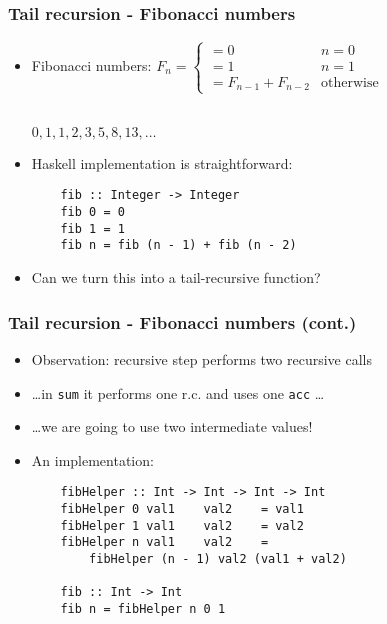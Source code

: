 \documentclass[final,handout]{beamer}
\begin{document}
\begin{frame}[fragile]
    \frametitle{Tail recursion - Fibonacci numbers}

    \begin{itemize}

        \item Fibonacci numbers: $F_n = 
            \begin{cases}
                = 0 & n = 0 \\
                = 1 & n = 1 \\
                = F_{n-1} + F_{n-2} & \text{otherwise} 
            \end{cases}$

            ~\\
            $0, 1, 1, 2, 3, 5, 8, 13, \dots$

        \item<2-> Haskell implementation is straightforward:

            \begin{lstlisting}
    fib :: Integer -> Integer
    fib 0 = 0
    fib 1 = 1
    fib n = fib (n - 1) + fib (n - 2)
            \end{lstlisting}

        \item<3-> Can we turn this into a tail-recursive function?

    \end{itemize}

\end{frame}

\begin{frame}[fragile]
    \frametitle{Tail recursion - Fibonacci numbers (cont.)}

    \begin{itemize}
        \item Observation: recursive step performs two recursive calls
        \item<2-> \dots in \texttt{sum} it performs one r.c. and uses one
            \texttt{acc} \dots
        \item<3-> \dots we are going to use two intermediate values!

        \item<4-> An implementation:
            \begin{lstlisting}
    fibHelper :: Int -> Int -> Int -> Int
    fibHelper 0 val1    val2    = val1
    fibHelper 1 val1    val2    = val2
    fibHelper n val1    val2    =
        fibHelper (n - 1) val2 (val1 + val2)

    fib :: Int -> Int
    fib n = fibHelper n 0 1
            \end{lstlisting}

    \end{itemize}
\end{frame}
\end{document}

